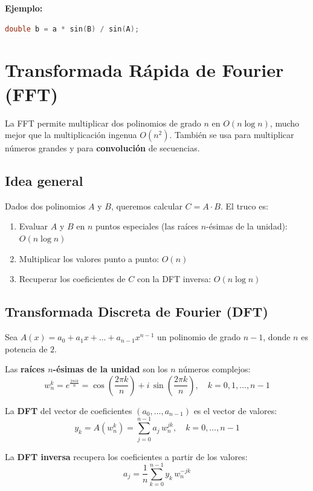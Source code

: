 \textbf{Ejemplo:}
\begin{lstlisting}[language=C++, caption={Ley de Senos: obtener un lado}]
	double b = a * sin(B) / sin(A);
\end{lstlisting}


\section{Transformada Rápida de Fourier (FFT)}

La FFT permite multiplicar dos polinomios de grado $n$ en $O(n \log n)$, mucho mejor que la multiplicación ingenua $O(n^2)$. También se usa para multiplicar números grandes y para \textbf{convolución} de secuencias.

\subsection{Idea general}

Dados dos polinomios $A$ y $B$, queremos calcular $C = A \cdot B$. El truco es:

\begin{enumerate}
    \item Evaluar $A$ y $B$ en $n$ puntos especiales (las raíces $n$-ésimas de la unidad): $O(n \log n)$
    \item Multiplicar los valores punto a punto: $O(n)$
    \item Recuperar los coeficientes de $C$ con la DFT inversa: $O(n \log n)$
\end{enumerate}

\subsection{Transformada Discreta de Fourier (DFT)}

Sea $A(x) = a_0 + a_1 x + \dots + a_{n-1} x^{n-1}$ un polinomio de grado $n-1$, donde $n$ es potencia de $2$.

Las \textbf{raíces $n$-ésimas de la unidad} son los $n$ números complejos:
\[
w_n^k = e^{\frac{2\pi i k}{n}} = \cos\!\left(\frac{2\pi k}{n}\right) + i\,\sin\!\left(\frac{2\pi k}{n}\right), \quad k = 0, 1, \dots, n-1
\]

La \textbf{DFT} del vector de coeficientes $(a_0, \dots, a_{n-1})$ es el vector de valores:
\[
y_k = A(w_n^k) = \sum_{j=0}^{n-1} a_j \, w_n^{jk}, \quad k = 0, \dots, n-1
\]

La \textbf{DFT inversa} recupera los coeficientes a partir de los valores:
\[
a_j = \frac{1}{n} \sum_{k=0}^{n-1} y_k \, w_n^{-jk}
\]

